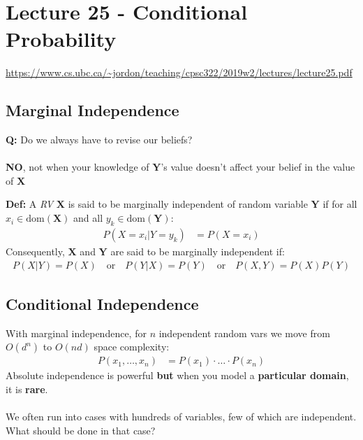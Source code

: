 \documentclass{article}
\def\blu#1{{\color{blu}#1}}
\def\gre#1{{\color{gre}#1}}
\begin{document}
\newpage

\section*{Lecture 25 - Conditional Probability}
\url{https://www.cs.ubc.ca/~jordon/teaching/cpsc322/2019w2/lectures/lecture25.pdf}

\subsection*{Marginal Independence}
\textbf{Q:} Do we always have to revise our beliefs?\\
\\
\textbf{\blu{NO}}, not when your knowledge of $\mathbf{Y}$’s value doesn't affect your belief in the value of $\mathbf{X}$
\begin{siderules}
\textbf{Def:} A \textit{RV} $\mathbf{X}$ is said to be marginally independent of random variable $\mathbf{Y}$ if for all $ x_i \in \text{dom}(\mathbf{X}) $ and all $ y_k \in \text{dom}(\mathbf{Y}) $:
\begin{align*}
P(X = x_i | Y = y_k) &= P(X = x_i)
\end{align*}
Consequently, $\mathbf{X}$ and $\mathbf{Y}$ are said to be marginally independent if:
\begin{align*}
P(X|Y) = P(X) \quad \text{or} \quad P(Y|X) = P(Y) \quad \text{or} \quad P(X, Y) = P(X) P(Y)
\end{align*}
	\end{siderules}

\subsection*{Conditional Independence}
With marginal independence, for $ n $ independent random vars we move from $ O(d^n) $ to $ O(nd) $ space complexity:
\gre{
\begin{align*}
P(x_1, \dots, x_n) &= P(x_1) \cdot \dots \cdot P(x_n)
\end{align*}
}
Absolute independence is powerful \textbf{but} when you model a \textbf{particular domain}, it is \textbf{rare}. \\
\\
We often run into cases with hundreds of variables, few of which are independent. What should be done in that case?
\end{document}
